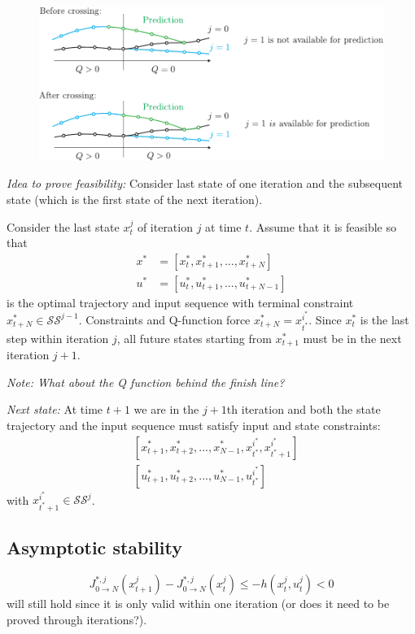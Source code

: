 \documentclass{article}
\begin{document}
\begin{figure}[ht]
	\centering
	\includegraphics[width=1.0\textwidth]{../Figures/Illustrator/LMPC/Feasibility.pdf} 
	\label{fig1}
\end{figure}

\textit{Idea to prove feasibility:} Consider last state of one iteration and the subsequent state (which is the first state of the next iteration).

Consider the last state $x_t^j$ of iteration $j$ at time $t$. Assume that it is feasible so that
\begin{align}
x^* &= [x_t^*, x_{t+1}^*, ..., x_{t+N}^*]\\
u^* &= [u_t^*, u_{t+1}^*, ..., u_{t+N-1}^*]
\end{align}
is the optimal trajectory and input sequence with terminal constraint $x_{t+N}^*\in\mathcal{SS}^{j-1}$. Constraints and Q-function force $x_{t+N}^* = x_{t^*}^{i^*}$. Since $x_t^*$ is the last step within iteration $j$, all future states starting from $x_{t+1}^*$ must be in the next iteration $j+1$.

\emph{Note: What about the Q function behind the finish line?}

\emph{Next state:} At time $t+1$ we are in the $j+1$th iteration and both the state trajectory and the input sequence must satisfy input and state constraints:
\begin{align}
&[x_{t+1}^*,x_{t+2}^*,...,x_{N-1}^*, x_{t^*}^{i^*}, x_{t^*+1}^{i^*}]\\
&[u_{t+1}^*,u_{t+2}^*,...,u_{N-1}^*, u_{t^*}^{i^*}]
\end{align}
with $x_{t^*+1}^{i^*}\in\mathcal{SS}^j$.

\subsection{Asymptotic stability}
\begin{equation}\label{eq:stability}
J_{0\rightarrow N}^{*,j}(x_{t+1}^j)-J_{0\rightarrow N}^{*,j}(x_{t}^j)\leq -h(x_t^j,u_t^j)<0
\end{equation}
will still hold since it is only valid within one iteration (or does it need to be proved through iterations?).
\end{document}
